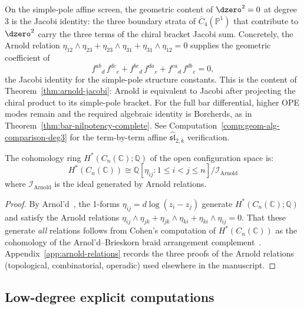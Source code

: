 \begin{remark}\label{rem:arnold-jacobi-geometric}
On the simple-pole affine screen, the geometric content of
$\dzero^2=0$ at degree~$3$ is the Jacobi identity: the three boundary
strata of $\overline{C}_4(\mathbb{P}^1)$ that contribute to
$\dzero^2$ carry the three terms of the chiral bracket Jacobi sum.
Concretely, the Arnold relation
$\eta_{12} \wedge \eta_{23} + \eta_{23} \wedge \eta_{31}
+ \eta_{31} \wedge \eta_{12} = 0$ supplies the geometric coefficient of
\[
{f^{ab}}_d\,{f^{dc}}_e + {f^{bc}}_d\,{f^{da}}_e + {f^{ca}}_d\,{f^{db}}_e = 0,
\]
the Jacobi identity for the simple-pole structure constants. This is
the content of Theorem~\ref{thm:arnold-jacobi}: Arnold is equivalent
to Jacobi after projecting the chiral product to its simple-pole
bracket. For the full bar differential, higher OPE modes remain and
the required algebraic identity is Borcherds, as in
Theorem~\ref{thm:bar-nilpotency-complete}. See
Computation~\ref{comp:geom-alg-comparison-deg3} for the
term-by-term affine $\widehat{\mathfrak{sl}}_{2,k}$ verification.
\end{remark}

\begin{corollary}\label{cor:cohomology-config}
The cohomology ring $H^*(C_n(\mathbb{C}); \mathbb{Q})$ of the open configuration space is:
\[H^*(C_n(\mathbb{C})) \cong \mathbb{Q}[\eta_{ij} : 1 \leq i < j \leq n] / \mathcal{I}_{\text{Arnold}}\]
where $\mathcal{I}_{\text{Arnold}}$ is the ideal generated by Arnold relations.
\end{corollary}

\begin{proof}
By Arnol'd~\cite{Arnold69}, the 1-forms $\eta_{ij} = d\log(z_i - z_j)$ generate $H^*(C_n(\mathbb{C}); \mathbb{Q})$ and satisfy the Arnold relations $\eta_{ij} \wedge \eta_{jk} + \eta_{jk} \wedge \eta_{ki} + \eta_{ki} \wedge \eta_{ij} = 0$. That these generate \emph{all} relations follows from Cohen's computation of $H^*(C_n(\mathbb{C}))$ as the cohomology of the Arnol'd--Brieskorn braid arrangement complement~\cite{Coh76}. Appendix~\ref{app:arnold-relations} records the three proofs of the
Arnold relations (topological, combinatorial, operadic) used
elsewhere in the manuscript.
\end{proof}

\subsection{Low-degree explicit computations}

